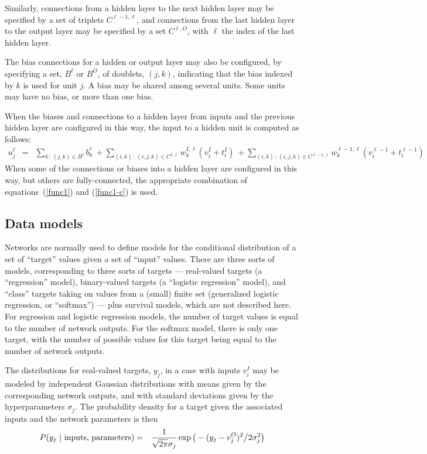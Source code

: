 \documentclass{report}[11pt]
\def\beq{\begin{eqnarray}}
\def\eeq{\end{eqnarray}}
\def\eep{\end{eqnarray}}
\begin{document}
Similarly, connections from a hidden layer to the next hidden layer
may be specified by a set of triplets $C^{\ell\!-\!1,\ell}$, and
connections from the last hidden layer to the output layer may be
specified by a set $C^{\ell,O}$, with $\ell$ the index of the last
hidden layer.

The bias connections for a hidden or output layer may also be
configured, by specifying a set, $B^{\ell}$ or $B^O$, of doublets,
$(j,k)$, indicating that the bias indexed by $k$ is used for unit $j$.
A bias may be shared among several units. Some units may have no bias,
or more than one bias.

When the biases and connections to a hidden layer from inputs and the
previous hidden layer are configured in this way, the input to a hidden
unit is computed as follows:
\beq
  u^{\ell}_j & = & 
         \sum_{k\,:\, (j,k)\in B^{\ell}}\!\!\!\!\!\!
                        b^{\ell}_k \ +\!\!\!
         \sum_{(i,k)\,:\, (i,j,k)\in C^{I,\ell}}\!\!\!\!\!\!
                        w^{I,\ell}_k (v^I_i+t^I_i) \ +\!\!\!
         \sum_{(i,k)\,:\, (i,j,k)\in C^{\ell\!-\!1,\ell}}\!\!\!\!\!\!
               w^{\ell-1,\ell}_k (v^{\ell-1}_i+t^{\ell-1}_i)
\label{func1-c}\eeq%
When some of the connections or biases into a hidden layer are
configured in this way, but others are fully-connected, the
appropriate combination of equations~(\ref{func1}) and (\ref{func1-c})
is used.


\subsection*{Data models}\label{app-sec-models}

Networks are normally used to define models for the conditional
distribution of a set of ``target'' values given a set of ``input''
values.  There are three sorts of models, corresponding to three sorts
of targets --- real-valued targets (a ``regression'' model),
binary-valued targets (a ``logistic regression'' model), and ``class''
targets taking on values from a (small) finite set (generalized
logistic regression, or ``softmax'') --- plus survival models, which
are not described here.  For regression and logistic regression
models, the number of target values is equal to the number of network
outputs.  For the softmax model, there is only one target, with the
number of possible values for this target being equal to the number of
network outputs.

The distributions for real-valued targets, $y_j$, in a case with inputs 
$v^I_i$ may be modeled by independent Gaussian distributions 
with means given by the corresponding network outputs, and with
standard deviations given by the hyperparameters $\sigma_{j}$.  
The probability density for a target given the associated inputs and
the network parameters is then\beq
  P(y_j\ |\ \mbox{inputs},\, \mbox{parameters}) & = &
    {1 \over \sqrt{2\pi} \sigma_{j}} 
    \exp \big( - (y_j-v^O_j)^2 \big/ 2\sigma_{j}^2 \big)
\label{regg}\eep
\end{document}
